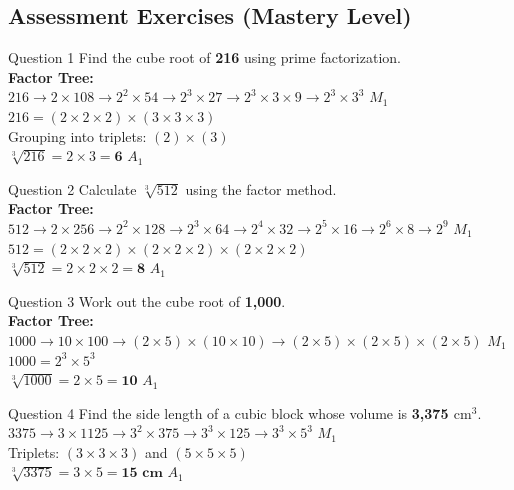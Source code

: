\documentclass[12pt, a4paper, oneside]{article}
\begin{document}
\subsection*{Assessment Exercises (Mastery Level)}

\begin{solvingbox}{Question 1}
Find the cube root of \textbf{216} using prime factorization. \\
\textbf{Factor Tree:} \\
$216 \rightarrow 2 \times 108 \rightarrow 2^2 \times 54 \rightarrow 2^3 \times 27 \rightarrow 2^3 \times 3 \times 9 \rightarrow 2^3 \times 3^3$ \hfill $M_1$ \\
$216 = (2 \times 2 \times 2) \times (3 \times 3 \times 3)$ \\
Grouping into triplets: $(2) \times (3)$ \\
$\sqrt[3]{216} = 2 \times 3 = \mathbf{6}$ \hfill $A_1$
\end{solvingbox}

\begin{solvingbox}{Question 2}
Calculate $\sqrt[3]{512}$ using the factor method. \\
\textbf{Factor Tree:} \\
$512 \rightarrow 2 \times 256 \rightarrow 2^2 \times 128 \rightarrow 2^3 \times 64 \rightarrow 2^4 \times 32 \rightarrow 2^5 \times 16 \rightarrow 2^6 \times 8 \rightarrow 2^9$ \hfill $M_1$ \\
$512 = (2 \times 2 \times 2) \times (2 \times 2 \times 2) \times (2 \times 2 \times 2)$ \\
$\sqrt[3]{512} = 2 \times 2 \times 2 = \mathbf{8}$ \hfill $A_1$
\end{solvingbox}

\begin{solvingbox}{Question 3}
Work out the cube root of \textbf{1,000}. \\
\textbf{Factor Tree:} \\
$1000 \rightarrow 10 \times 100 \rightarrow (2 \times 5) \times (10 \times 10) \rightarrow (2 \times 5) \times (2 \times 5) \times (2 \times 5)$ \hfill $M_1$ \\
$1000 = 2^3 \times 5^3$ \\
$\sqrt[3]{1000} = 2 \times 5 = \mathbf{10}$ \hfill $A_1$
\end{solvingbox}

\begin{solvingbox}{Question 4}
Find the side length of a cubic block whose volume is \textbf{3,375 $\text{cm}^3$}. \\
$3375 \rightarrow 3 \times 1125 \rightarrow 3^2 \times 375 \rightarrow 3^3 \times 125 \rightarrow 3^3 \times 5^3$ \hfill $M_1$ \\
Triplets: $(3 \times 3 \times 3)$ and $(5 \times 5 \times 5)$ \\
$\sqrt[3]{3375} = 3 \times 5 = \mathbf{15\text{ cm}}$ \hfill $A_1$
\end{solvingbox}
\end{document}
